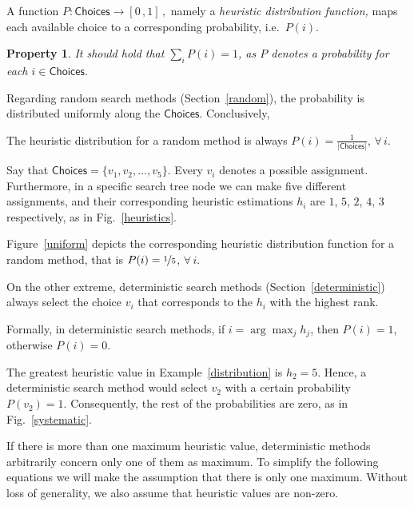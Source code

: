 \documentclass{ws-ijait}
\newtheorem{property}{Property}
\begin{document}
\begin{definition}
\label{hdf}
A function $P: \mathsf{Choices} \to [0 \, , 1]\,,$ namely a \emph{heuristic distribution function,} maps each available choice to a corresponding probability, i.e.\ $P(i)$.
\end{definition}
\begin{property}
It should hold that $\sum_i P(i) = 1$, as $P$ denotes a probability for each $i \in \mathsf{Choices}$.
\end{property}
Regarding random search methods (Section~\ref{random}), the probability is distributed uniformly along the $\mathsf{Choices}$. Conclusively,
\begin{proposition}
\label{probability-random}
The heuristic distribution for a random method is always $P(i) = \frac{1}{|\mathsf{Choices}|}$, $\forall \, i$.
\end{proposition}
\begin{example}
\label{distribution}
Say that $\mathsf{Choices} = \{ v_1, v_2, \ldots, v_5 \}$. Every $v_i$ denotes a possible assignment. Furthermore, in a specific search tree node we can make five different assignments, and their corresponding heuristic estimations $h_i$ are $1$, $5$, $2$, $4$, $3$ respectively, as in Fig.~\ref{heuristics}.

Figure~\ref{uniform} depicts the corresponding heuristic distribution function for a random method, that is $P(i) = \nicefrac{1}{5}$, $\forall \, i$.
\end{example}
On the other extreme, deterministic search methods (Section~\ref{deterministic}) always select the choice $v_i$ that corresponds to the $h_i$ with the highest rank.
\begin{proposition}
\label{probability-deterministic}
Formally, in deterministic search methods, if $i = \arg\max_j h_j$, then $P(i) = 1$, otherwise $P(i) = 0$.
\end{proposition}
\begin{example}
The greatest heuristic value in Example~\ref{distribution} is $h_2 = 5$. Hence, a deterministic search method would select $v_2$ with a certain probability $P(v_2) = 1$. Consequently, the rest of the probabilities are zero, as in Fig.~\ref{systematic}.
\end{example}
If there is more than one maximum heuristic value, deterministic methods arbitrarily concern only one of them as maximum. To simplify the following equations we will make the assumption that there is only one maximum. Without loss of generality, we also assume that heuristic values are non-zero.
\end{document}
